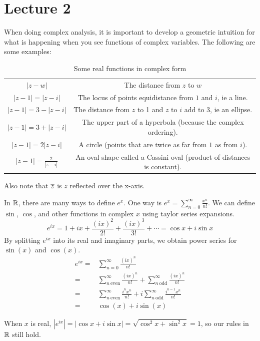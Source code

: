 \documentclass[11pt,leqno,oneside]{amsart}
\numberwithin{thm}{section}
\begin{document}
\section{Lecture 2}
When doing complex analysis, it is important to develop a geometric intuition
for what is happening when you see functions of complex variables. The
following are some examples:
\begin{table}
    \centering
    \begin{tabular}{|c|c|}
        \hline
        $|z-w|$ & The distance from $z$ to $w$ \\
        $|z-1|=|z-i|$ & The locus of points equidistance from $1$ and $i$, ie a line. \\
        $|z-1|=3-|z-i|$ & The distance from $z$ to 1 and $z$ to $i$
                          add to 3, ie an ellipse. \\
        $|z-1|=3+|z-i|$ & The upper part of a hyperbola (because the complex ordering). \\
        $|z-1|=2|z-i|$ & A circle (points that are twice as far from $1$ as from $i$). \\
        $|z-1|=\frac{2}{|z-i|}$ & An oval shape called a Cassini oval (product of distances is constant). \\
        \hline
    \end{tabular}
    \caption{Some real functions in complex form}
    \label{tab:func-descs}
\end{table}
Also note that $\overline{z}$ is $z$ reflected over the x-axis.

In ${\mathbb R}$, there are many ways to define $e^x$. One way is $e^x =
\sum_{n=0}^\infty \frac{x^n}{n!}$. We can define $\sin$, $\cos$, and other functions in complex $x$ using taylor series expansions.
\[
    e^{ix} = 1 + ix + \frac{(ix)^2}{2!} + \frac{(ix)^3}{3!} + \cdots = \cos x + i \sin x
\]
By splitting $e^{ix}$ into its real and imaginary parts, we obtain power series for $\sin(x)$ and $\cos(x)$.
\begin{align*}
  e^{ix} =& \sum_{n=0}^\infty \frac{(ix)^n}{n!}  \\
  =& \sum_{n\ \text{even}}^\infty \frac{(ix)^n}{n!} + \sum_{n\ \text{odd}}^\infty \frac{(ix)^n}{n!} \\
  =& \sum_{n\ \text{even}}^\infty \frac{i^n x^n}{n!} + i\sum_{n\ \text{odd}}^\infty \frac{i^{n-1} x^n}{n!} \\
  =& \cos(x) + i \sin(x)
\end{align*}

When $x$ is real, $|e^{ix}| = |\cos x + i \sin x| = \sqrt{\cos^2 x + \sin^2 x}
= 1$, so our rules in ${\mathbb R}$ still hold.
\end{document}
